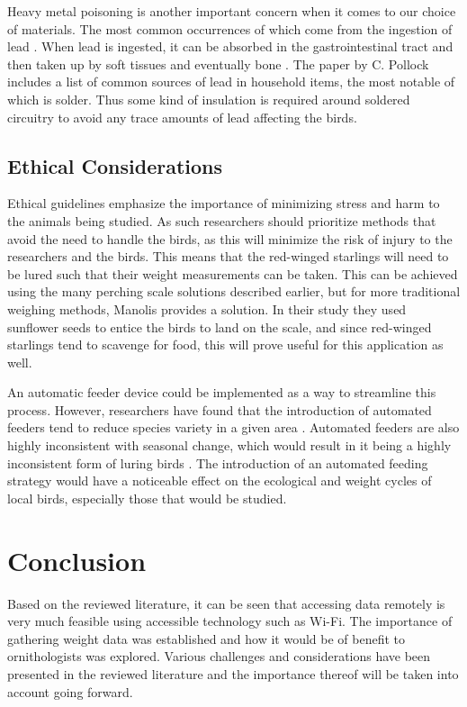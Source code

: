 \documentclass[class=report,11pt,crop=false]{standalone}
\begin{document}
Heavy metal poisoning is another important concern when it comes to our choice of materials. The most common occurrences of which come from the ingestion of lead \cite{PollockHeavyMetal}. When lead is ingested, it can be absorbed in the gastrointestinal tract and then taken up by soft tissues and eventually bone \cite{PollockHeavyMetal}. The paper by C. Pollock includes a list of common sources of lead in household items, the most notable of which is solder. Thus some kind of insulation is required around soldered circuitry to avoid any trace amounts of lead affecting the birds.

\subsection{Ethical Considerations}
Ethical guidelines emphasize the importance of minimizing stress and harm to the animals being studied. As such researchers should prioritize methods that avoid the need to handle the birds, as this will minimize the risk of injury to the researchers and the birds. This means that the red-winged starlings will need to be lured such that their weight measurements can be taken. This can be achieved using the many perching scale solutions described earlier, but for more traditional weighing methods, Manolis \cite{reid1999measurement} provides a solution. In their study they used sunflower seeds to entice the birds to land on the scale, and since red-winged starlings tend to scavenge for food, this will prove useful for this application as well. 

An automatic feeder device could be implemented as a way to streamline this process. However, researchers have found that the introduction of automated feeders tend to reduce species variety in a given area \cite{GalbraithFeeders}. Automated feeders are also highly inconsistent with seasonal change, which would result in it being a highly inconsistent form of luring birds \cite{GalbraithFeeders}. The introduction of an automated feeding strategy would have a noticeable effect on the ecological and weight cycles of local birds, especially those that would be studied.

\section{Conclusion}

Based on the reviewed literature, it can be seen that accessing data remotely is very much feasible using accessible technology such as Wi-Fi. The importance of gathering weight data was established and how it would be of benefit to ornithologists was explored. Various challenges and considerations have been presented in the reviewed literature and the importance thereof will be taken into account going forward. 

\ifstandalone

\printnoidxglossary[type=\acronymtype,nonumberlist]
\fi
\end{document}
